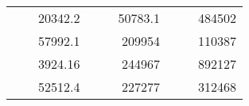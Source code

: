 \begin{table}[H]
\begin{tabular}{|ccrccrccc}
\rowcolor[HTML]{DDFDFF} 
\multicolumn{1}{|c|}{\cellcolor[HTML]{FFFFC7}}                                & \multicolumn{1}{c|}{\cellcolor[HTML]{DDFDFF}}                      & \multicolumn{1}{r|}{\cellcolor[HTML]{DAE8FC}20342.2}   & \multicolumn{1}{c|}{\cellcolor[HTML]{FFFFC7}}                                & \multicolumn{1}{c|}{\cellcolor[HTML]{DDFDFF}}                       & \multicolumn{1}{r|}{\cellcolor[HTML]{DDFDFF}50783.1}   & \multicolumn{1}{c|}{\cellcolor[HTML]{FFFFC7}}                                & \multicolumn{1}{c|}{\cellcolor[HTML]{DDFDFF}}                      & \multicolumn{1}{r|}{\cellcolor[HTML]{DDFDFF}484502}    \\ \cline{3-3} \cline{6-6} \cline{9-9} 
\multicolumn{1}{|c|}{\cellcolor[HTML]{FFFFC7}}                                & \multicolumn{1}{c|}{\cellcolor[HTML]{DDFDFF}}                      & \multicolumn{1}{r|}{\cellcolor[HTML]{DDFDFF}57992.1}   & \multicolumn{1}{c|}{\cellcolor[HTML]{FFFFC7}}                                & \multicolumn{1}{c|}{\cellcolor[HTML]{DDFDFF}}                       & \multicolumn{1}{r|}{\cellcolor[HTML]{DAE8FC}209954}    & \multicolumn{1}{c|}{\cellcolor[HTML]{FFFFC7}}                                & \multicolumn{1}{c|}{\cellcolor[HTML]{DDFDFF}}                      & \multicolumn{1}{r|}{\cellcolor[HTML]{DAE8FC}110387}    \\ \cline{3-3} \cline{6-6} \cline{9-9} 
\rowcolor[HTML]{DDFDFF} 
\multicolumn{1}{|c|}{\cellcolor[HTML]{FFFFC7}}                                & \multicolumn{1}{c|}{\cellcolor[HTML]{DDFDFF}}                      & \multicolumn{1}{r|}{\cellcolor[HTML]{DAE8FC}3924.16}   & \multicolumn{1}{c|}{\cellcolor[HTML]{FFFFC7}}                                & \multicolumn{1}{c|}{\cellcolor[HTML]{DDFDFF}}                       & \multicolumn{1}{r|}{\cellcolor[HTML]{DDFDFF}244967}    & \multicolumn{1}{c|}{\cellcolor[HTML]{FFFFC7}}                                & \multicolumn{1}{c|}{\cellcolor[HTML]{DDFDFF}}                      & \multicolumn{1}{r|}{\cellcolor[HTML]{DDFDFF}892127}    \\ \cline{3-3} \cline{6-6} \cline{9-9} 
\multicolumn{1}{|c|}{\cellcolor[HTML]{FFFFC7}}                                & \multicolumn{1}{c|}{\cellcolor[HTML]{DDFDFF}}                      & \multicolumn{1}{r|}{\cellcolor[HTML]{DDFDFF}52512.4}   & \multicolumn{1}{c|}{\cellcolor[HTML]{FFFFC7}}                                & \multicolumn{1}{c|}{\cellcolor[HTML]{DDFDFF}}                       & \multicolumn{1}{r|}{\cellcolor[HTML]{DAE8FC}227277}    & \multicolumn{1}{c|}{\cellcolor[HTML]{FFFFC7}}                                & \multicolumn{1}{c|}{\cellcolor[HTML]{DDFDFF}}                      & \multicolumn{1}{r|}{\cellcolor[HTML]{DAE8FC}312468}    \\ \cline{3-3} \cline{6-6} \cline{9-9} 

\end{tabular}
\end{table}
